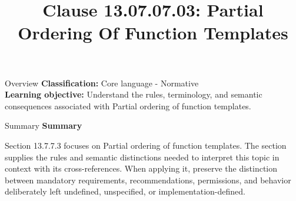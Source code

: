 \documentclass[10pt,letterpaper]{article}
\title{Clause 13.07.07.03: Partial Ordering Of Function Templates}
\author{}
\date{}
\begin{document}
\maketitle
\begin{CornellOverviewBox}{Overview}
\textbf{Classification:} Core language - Normative\\[2pt]
\textbf{Learning objective:} Understand the rules, terminology, and semantic consequences associated with Partial ordering of function templates.
\end{CornellOverviewBox}\begin{CornellSummaryBox}{Summary}
{\sffamily\bfseries\color{Accent} Summary}\par\vspace{3pt}Section 13.7.7.3 focuses on Partial ordering of function templates. The section supplies the rules and semantic distinctions needed to interpret this topic in context with its cross-references. When applying it, preserve the distinction between mandatory requirements, recommendations, permissions, and behavior deliberately left undefined, unspecified, or implementation-defined.
\end{CornellSummaryBox}
\end{document}
